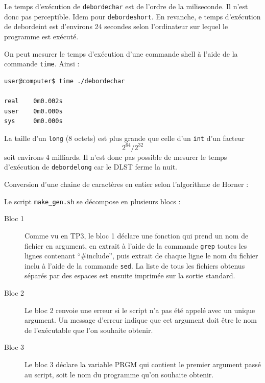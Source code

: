 \documentclass[10pt]{article}
\begin{document}
\begin{enumerate}[label=\textbf{[\alph*]}]
\item Le temps d'exécution de \texttt{debordechar} est de l'ordre de la
  miliseconde. Il n'est donc pas perceptible. Idem pour
  \texttt{debordeshort}. En revanche, e temps d'exécution de debordeint
  est d'environs 24 secondes selon l'ordinateur sur lequel le programme est
  exécuté.

  On peut mesurer le temps d'exécution d'une commande shell à l'aide de la
  commande \texttt{time}. Ainsi :

\begin{verbatim}
user@computer$ time ./debordechar

real    0m0.002s
user    0m0.000s
sys     0m0.000s
\end{verbatim}

La taille d'un \texttt{long} (8 octets) est plus grande que celle d'un
\texttt{int} d'un facteur $$ 2^{64} / 2^{32} $$ soit  environs 4 milliards. Il
n'est donc pas possible de mesurer le temps d'exécution de \texttt{debordelong}
car le DLST ferme la nuit.

\newpage

\item Conversion d'une chaine de caractères en entier selon l'algorithme de
  Horner :

  

\item Le script \texttt{make\_gen.sh} se décompose en plusieurs blocs :
  \begin{description}

  \item [Bloc 1] Comme vu en TP3, le bloc 1 déclare une fonction qui prend un
    nom de fichier en argument,
    en extrait à l'aide de la commande \texttt{grep} toutes les lignes contenant
    ``\#include'', puis extrait de chaque ligne le nom du fichier inclu à l'aide
    de la commande \texttt{sed}. La liste de tous les fichiers obtenus séparés
    par des espaces est
    ensuite imprimée sur la sortie standard.

  \item [Bloc 2] Le bloc 2 renvoie une erreur si le script n'a pas été appelé
    avec un unique argument. Un message d'erreur indique que cet argument doit
    être le nom de l'exécutable que l'on souhaite obtenir.

  \item [Bloc 3] Le bloc 3 déclare la variable PRGM qui contient le premier
    argument passé au script, soit le nom du programme qu'on souhaite obtenir.


\end{description}
\end{enumerate}
\end{document}
